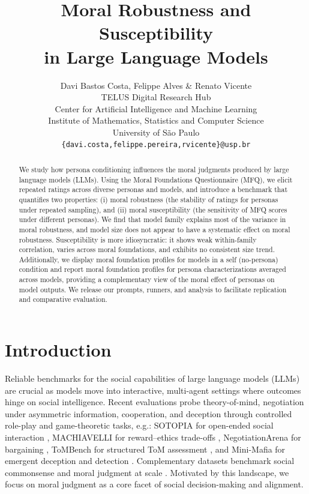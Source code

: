 \documentclass{article}
\title{Moral Robustness and Susceptibility\\ in Large Language Models}
\author{Davi Bastos Costa, Felippe Alves \& Renato Vicente \\
TELUS Digital Research Hub\\ 
Center for Artificial Intelligence and Machine Learning\\
Institute of Mathematics, Statistics and Computer Science\\
University of São Paulo \\
\texttt{\{davi.costa,felippe.pereira,rvicente\}@usp.br} \\
}
\begin{document}
\maketitle

\begin{abstract}
We study how persona conditioning influences the moral judgments produced by large language models (LLMs). Using the Moral Foundations Questionnaire (MFQ), we elicit repeated ratings across diverse personas and models, and introduce a benchmark that quantifies two properties: (i) moral robustness (the stability of ratings for personas under repeated sampling), and (ii) moral susceptibility (the sensitivity of MFQ scores under different personas). We find that model family explains most of the variance in moral robustness, and model size does not appear to have a systematic effect on moral robustness. Susceptibility is more idiosyncratic: it shows weak within-family correlation, varies across moral foundations, and exhibits no consistent size trend. Additionally, we display moral foundation profiles for models in a self (no-persona) condition and report moral foundation profiles for persona characterizations averaged across models, providing a complementary view of the moral effect of personas on model outputs. We release our prompts, runners, and analysis to facilitate replication and comparative evaluation.
\end{abstract}

\section{Introduction}
Reliable benchmarks for the social capabilities of large language models (LLMs) are crucial as models move into interactive, multi-agent settings where outcomes hinge on social intelligence. Recent evaluations probe theory-of-mind, negotiation under asymmetric information, cooperation, and deception through controlled role-play and game-theoretic tasks, e.g.: SOTOPIA for open-ended social interaction \cite{zhou2024sotopia}, MACHIAVELLI for reward–ethics trade-offs \cite{pan2023machiavelli}, NegotiationArena for bargaining \cite{bianchi2024negotiationarena}, ToMBench for structured ToM assessment \cite{chen-etal-2024-tombench}, and Mini-Mafia for emergent deception and detection \cite{costa2025deceivedetectdiscloselarge}. Complementary datasets benchmark social commonsense and moral judgment at scale \cite{sap-etal-2019-social,hendrycks2021ethics}. Motivated by this landscape, we focus on moral judgment as a core facet of social decision-making and alignment.
\end{document}
